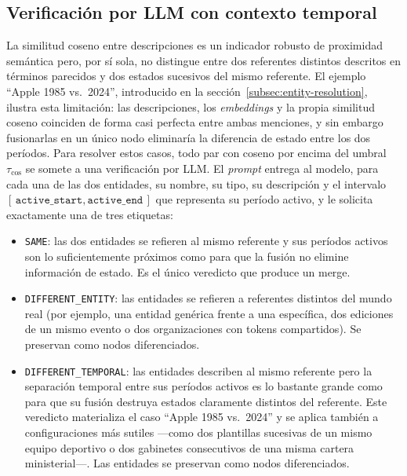 \subsection{Verificación por LLM con contexto temporal}\label{subsec:bt-cger-llm}

La similitud coseno entre descripciones es un indicador robusto de proximidad semántica pero, por sí sola, no distingue entre dos referentes distintos descritos en términos parecidos y dos estados sucesivos del mismo referente. El ejemplo ``Apple 1985 vs.\ 2024'', introducido en la sección~\ref{subsec:entity-resolution}, ilustra esta limitación: las descripciones, los \emph{embeddings} y la propia similitud coseno coinciden de forma casi perfecta entre ambas menciones, y sin embargo fusionarlas en un único nodo eliminaría la diferencia de estado entre los dos períodos. Para resolver estos casos, todo par con coseno por encima del umbral $\tau_{\cos}$ se somete a una verificación por LLM. El \emph{prompt} entrega al modelo, para cada una de las dos entidades, su nombre, su tipo, su descripción y el intervalo $[\,\texttt{active\_start}, \texttt{active\_end}\,]$ que representa su período activo, y le solicita exactamente una de tres etiquetas:

\begin{itemize}
    \item \texttt{SAME}: las dos entidades se refieren al mismo referente y sus períodos activos son lo suficientemente próximos como para que la fusión no elimine información de estado. Es el único veredicto que produce un merge.
    \item \texttt{DIFFERENT\_ENTITY}: las entidades se refieren a referentes distintos del mundo real (por ejemplo, una entidad genérica frente a una específica, dos ediciones de un mismo evento o dos organizaciones con tokens compartidos). Se preservan como nodos diferenciados.
    \item \texttt{DIFFERENT\_TEMPORAL}: las entidades describen al mismo referente pero la separación temporal entre sus períodos activos es lo bastante grande como para que su fusión destruya estados claramente distintos del referente. Este veredicto materializa el caso ``Apple 1985 vs.\ 2024'' y se aplica también a configuraciones más sutiles —como dos plantillas sucesivas de un mismo equipo deportivo o dos gabinetes consecutivos de una misma cartera ministerial—. Las entidades se preservan como nodos diferenciados.
\end{itemize}

